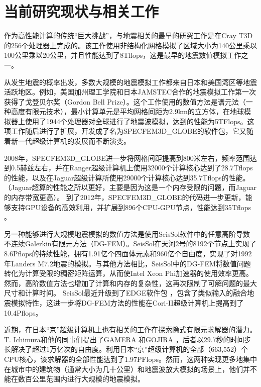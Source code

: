 \documentclass[degree=doctor]{thuthesis}
\begin{document}
\section{当前研究现状与相关工作}

作为高性能计算的传统“巨大挑战”，与地震相关的最早的研究工作是在Cray T3D \citep {bao1996earthquake}的256个处理器上完成的。该工作使用非结构化网格模拟了区域大小为140公里乘以100公里乘以20公里，并且性能达到了8Tflops，这是最早的地震数值模拟工作之一。

从发生地震的概率出发，多数大规模的地震模拟工作都来自日本和美国湾区等地震活跃地区。例如，美国加州理工学院和日本JAMSTEC\citep {es-gb-2003}合作的地震模拟工作第一次获得了戈登贝尔奖（Gordon Bell Prize）。这个工作使用的数值方法是谱元法（一种高度有限元技术），最小计算单元是平均网格间距为2.9km的立方体，在地球模拟器上使用了1944个处理器对全球进行了地震波模拟，达到的性能为5TFlops。这项工作随后进行了扩展，开发成了名为SPECFEM3D\_GLOBE的软件包，它又随着新一代超级计算机的发展而不断演变。

2008年，SPECFEM3D\_GLOBE进一步将网格间距提高到800米左右，频率范围达到0.5赫兹左右，并在Ranger超级计算机上使用32000个计算核心达到了28.7Tflops的性能，以及在Jaguar超级计算所使用29000个计算核心达到35.7Tflops的性能。（Jaguar超算的性能之所以更好，主要是因为这是一个内存受限的问题，而Jaguar的内存带宽更高）。 到了2012年，SPECFEM3D\_GLOBE的代码进一步更新，能够支持GPU设备的高效利用，并扩展到896个CPU-GPU节点，性能达到35Tflops \citep {rietmann2012forward}。

另一种能够进行大规模地震模拟的数值方法是使用SeisSol软件中的任意高阶导数不连续Galerkin有限元方法（DG-FEM）。SeisSol在天河2号的8192个节点上实现了8.6Pflops的持续性能\citep{tianhe2-2014gb}，拥有1.91亿个四面体元素和960亿个自由度，实现了对1992年Landers M7.2地震的模拟。与其他方法相比，SeisSol中的DG-FEM将数值问题转化为计算受限的稠密矩阵运算，从而使Intel Xeon Phi加速器的使用效率更高。然而，高阶数值方法也增加了计算和内存的复杂性，这再次限制了可解问题的最大尺寸和计算时间。 SeisSol最近升级到了EDGE软件包 \citep {breuer2017edge}，包含了类似输入的融合地震模拟特性，这进一步将DG-FEM方法的性能在Cori-II超级计算机上提高到了10.4Pflops。

近期，在日本“京”超级计算机上也有相关的工作在探索隐式有限元求解器的潜力。 T. Ichimura和他的同事们提出了GAMERA \citep {ichimura2014physics}和GOJIRA \citep {ichimura2015implicit}，后者以29.7秒的时间步长解决了超过1万亿次的自由度。利用日本“京”超级计算机的全部（663,552）个CPU核心，该求解器的全部性能达到了1.97PFlops。然而，这两种实现更多地集中在城市中的建筑物（通常大小为几十公里）和地震波放大模拟的场景上，他们并不能在数百公里范围内进行大规模的地震模拟。
\end{document}
